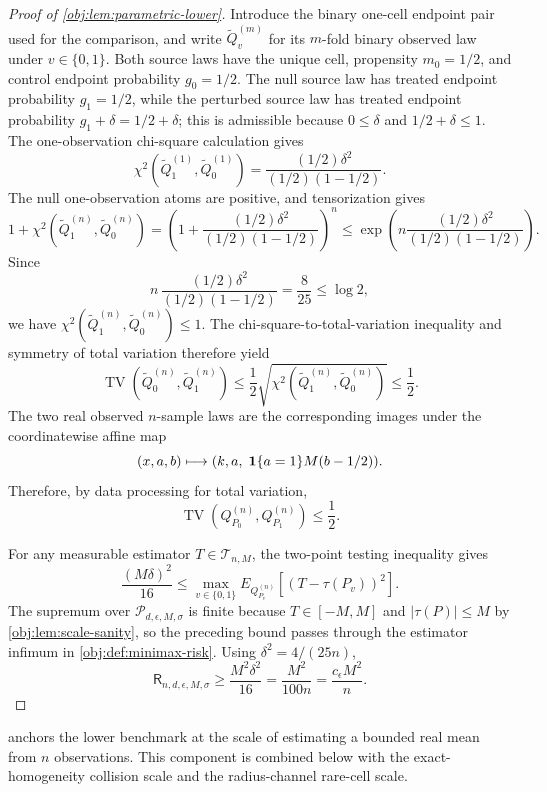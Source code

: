 \documentclass[11pt]{article}
\begin{document}
\begin{proof}[Proof of \cref{obj:lem:parametric-lower}]
Introduce the binary one-cell endpoint pair used for the comparison, and write \(\widetilde Q_v^{(m)}\) for its \(m\)-fold binary observed law under \(v\in\{0,1\}\).  Both source laws have the unique cell, propensity \(m_0=1/2\), and control endpoint probability \(g_0=1/2\).  The null source law has treated endpoint probability \(g_1=1/2\), while the perturbed source law has treated endpoint probability \(g_1+\delta=1/2+\delta\); this is admissible because \(0\le\delta\) and \(1/2+\delta\le1\).  The one-observation chi-square calculation gives
\[
\chi^2\!\left(\widetilde Q_1^{(1)},\widetilde Q_0^{(1)}\right)
=
\frac{(1/2)\delta^2}{(1/2)(1-1/2)}.
\]
The null one-observation atoms are positive, and tensorization gives
\[
1+
\chi^2\!\left(\widetilde Q_1^{(n)},\widetilde Q_0^{(n)}\right)
=
\left(1+\frac{(1/2)\delta^2}{(1/2)(1-1/2)}\right)^n
\le
\exp\!\left(
 n\frac{(1/2)\delta^2}{(1/2)(1-1/2)}
\right).
\]
Since
\[
n\,
\frac{(1/2)\delta^2}{(1/2)(1-1/2)}
=
\frac{8}{25}
\le \log 2,
\]
we have \(\chi^2(\widetilde Q_1^{(n)},\widetilde Q_0^{(n)})\le1\).  The chi-square-to-total-variation inequality and symmetry of total variation therefore yield
\[
\operatorname{TV}\!\left(\widetilde Q_0^{(n)},\widetilde Q_1^{(n)}\right)
\le
\frac12\sqrt{\chi^2\!\left(\widetilde Q_1^{(n)},\widetilde Q_0^{(n)}\right)}
\le\frac12 .
\]
The two real observed \(n\)-sample laws are the corresponding images under the coordinatewise affine map
\[
(x,a,b)\longmapsto (k,a,\;{\bf 1}\{a=1\}M(b-1/2)).
\]
Therefore, by data processing for total variation,
\[
\operatorname{TV}\!\left(Q_{P_0}^{(n)},Q_{P_1}^{(n)}\right)\le\frac12 .
\]

For any measurable estimator \(T\in\mathcal T_{n,M}\), the two-point testing inequality gives
\[
\frac{(M\delta)^2}{16}
\le
\max_{v\in\{0,1\}}
E_{Q_{P_v}^{(n)}}\!\left[(T-\tau(P_v))^2\right].
\]
The supremum over \(\mathcal P_{d,\epsilon,M,\sigma}\) is finite because \(T\in[-M,M]\) and \(|\tau(P)|\le M\) by \cref{obj:lem:scale-sanity}, so the preceding bound passes through the estimator infimum in \cref{obj:def:minimax-risk}. %
Using \(\delta^2=4/(25n)\),
\[
\mathsf R_{n,d,\epsilon,M,\sigma}
\ge
\frac{M^2\delta^2}{16}
=
\frac{M^2}{100n}
=
\frac{c_\epsilon M^2}{n}.
\]
\end{proof}

 anchors the lower benchmark at the scale of estimating a bounded real mean from \(n\) observations. This component is combined below with the exact-homogeneity collision scale and the radius-channel rare-cell scale.
\end{document}
